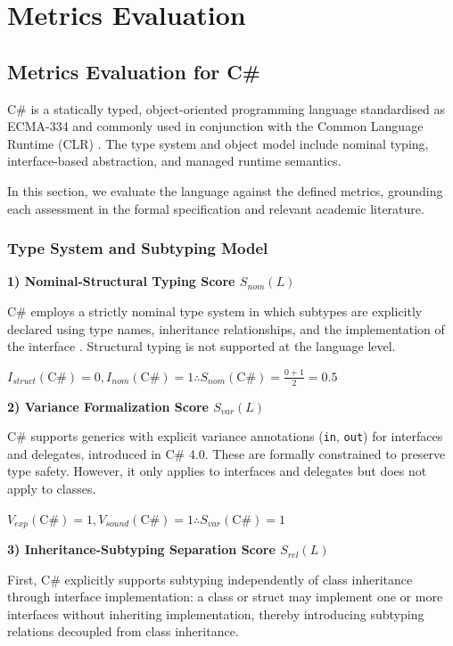 
\section{Metrics Evaluation}

\subsection{Metrics Evaluation for C\#}

C\# is a statically typed, object-oriented programming language standardised as ECMA-334 and commonly used in conjunction with the Common Language Runtime (CLR) \cite{ecma334}. The type system and object model include nominal typing, interface-based abstraction, and managed runtime semantics.

In this section, we evaluate the language against the defined metrics, grounding each assessment in the formal specification and relevant academic literature.

\subsubsection{Type System and Subtyping Model}

\textbf{1) Nominal-Structural Typing Score $S_{nom}(L)$}

C\# employs a strictly nominal type system in which subtypes are explicitly declared using type names, inheritance relationships, and the implementation of the interface \cite{ecma334}. Structural typing is not supported at the language level.

$I_{struct}(\text{C\#}) = 0, I_{nom}(\text{C\#}) = 1 \therefore S_{nom}(\text{C\#}) = \frac{0 + 1}{2} = 0.5 $

\textbf{2) Variance Formalization Score $S_{var}(L)$}

C\# supports generics with explicit variance annotations (\texttt{in}, \texttt{out}) for interfaces and delegates, introduced in C\# 4.0. These are formally constrained to preserve type safety.  However, it only applies to interfaces and delegates but does not apply to classes.

$V_{exp}(\text{C\#}) = 1, V_{sound}(\text{C\#}) = 1 \therefore S_{var}(\text{C\#}) = 1 $

\textbf{3) Inheritance-Subtyping Separation Score $S_{rel}(L)$}

First, C\# explicitly supports subtyping independently of class inheritance through interface implementation: a class or struct may implement one or more interfaces without inheriting implementation, thereby introducing subtyping relations decoupled from class inheritance.

